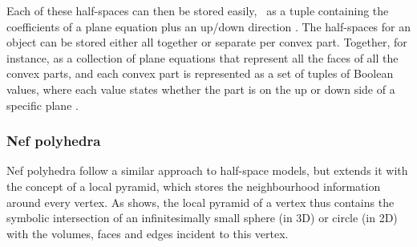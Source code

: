 Each of these half-spaces can then be stored easily, \eg\ as a tuple containing the coefficients of a plane equation plus an up/down direction \citep{Naylor90,Thompson07}.
The half-spaces for an object can be stored either all together or separate per convex part.
Together, for instance, as a collection of plane equations that represent all the faces of all the convex parts, and each convex part is represented as a set of tuples of Boolean values, where each value states whether the part is on the up or down side of a specific plane \citep{Tammik07}.

\subsubsection{Nef polyhedra}

Nef polyhedra \citep{Nef78,Bieri88} follow a similar approach to half-space models, but extends it with the concept of a local pyramid, which stores the neighbourhood information around every vertex.
As  shows, the local pyramid of a vertex thus contains the symbolic intersection of an infinitesimally small sphere (in 3D) or circle (in 2D) with the volumes, faces and edges incident to this vertex.
